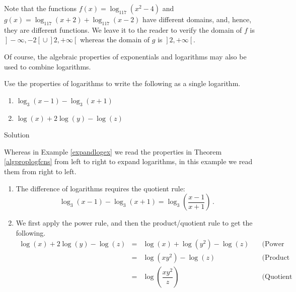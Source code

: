 \begin{example}
\begin{enumerate}
Note that the functions $f(x) = \log_{117}\left(x^2-4\right)$ and $g(x) = \log_{117}(x+2) + \log_{117}(x-2)$ have different domains, and, hence, they are different functions. We leave it to the reader to verify the domain of $f$ is $\left.\right]-\infty, -2\left[\right. \cup \left.\right]2,+\infty\left[\right.$ whereas the domain of $g$ is $\left.\right]2,+\infty\left[\right.$.
\end{enumerate}

\end{example}



Of course, the algebraic properties of exponentials and logarithms may also be used to combine logarithms. 
\fi

\begin{example}  \label{contractlogex} Use the properties of logarithms to write the following as a single logarithm.

\begin{multicols}{2}
\begin{enumerate}

\item  $\log_{3}(x-1) - \log_{3}(x+1)$

\item  $\log(x) + 2\log(y) - \log(z)$

\end{enumerate}
\end{multicols}

Solution 

\ifvc Whereas in Example \ref{expandlogex} we read the properties in Theorem \ref{algproplogfcns} from left to right to expand logarithms, in this example we read them from right to left. \fi

\begin{enumerate}

\item The difference of logarithms requires the quotient rule: 
$$\log_{3}(x-1) - \log_{3}(x+1) = \log_{3}\left(\frac{x-1}{x+1}\right)\,.$$

\item  We first apply the power rule, and then the product/quotient rule to get the following.
\setlength{\extrarowheight}{6pt}
\[ \begin{array}{rclr}

\log(x) + 2\log(y) - \log(z) & = & \log(x) + \log\left(y^2\right) - \log(z) & \quad\mbox{(Power rule.)} \\ [6pt]
                             & = & \log\left(xy^2\right) - \log(z) & \quad\mbox{(Product rule.)} \\ [10pt]
                             & = & \log\left( \dfrac{xy^2}{z}\right) & \quad\mbox{(Quotient rule.)} \\
                             
                            
\end{array}\]
\setlength{\extrarowheight}{2pt}

\end{enumerate}
\end{example}


